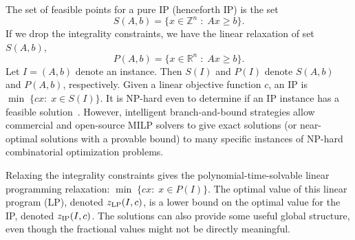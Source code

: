 The set of feasible points for a pure IP (henceforth IP) is the set
\begin{equation}
S(A,b)= \{x\in \mathbb{Z}^{n}\;:\; Ax\geq b\}  \label{S}.
\end{equation}
If we drop the integrality constraints, we have the linear relaxation of set $S(A,b)$,
\begin{equation}
P(A,b) = \{x\in \mathbb{R}^{n}\;:\; Ax\geq b\}. \label{P}
\end{equation}
Let $I=(A,b)$ denote an instance. Then $S(I)$ and $P(I)$ denote $S(A,b)$ and $P(A,b)$, respectively. Given a linear objective function $c$, an IP is $\min \;\{cx:\; x \in S(I)\}$. It is  NP-hard even to determine if an IP instance has a feasible solution~\cite{GareyJohnson}. However, intelligent branch-and-bound strategies allow commercial and open-source MILP solvers to give exact solutions (or near-optimal solutions with a provable bound) to many specific instances of NP-hard combinatorial optimization problems. 

Relaxing the integrality constraints gives the polynomial-time-solvable linear programming relaxation: $\min \;\{cx:\;x\in P(I) \}$.  The optimal value of this linear program (LP), denoted $z_{\operatorname{LP}}(I,c)$, is a lower bound on the optimal value for the IP, denoted $z_{\operatorname{IP}}(I,c)$. The solutions can also provide some useful global structure, even though the fractional values might not be directly meaningful. 

